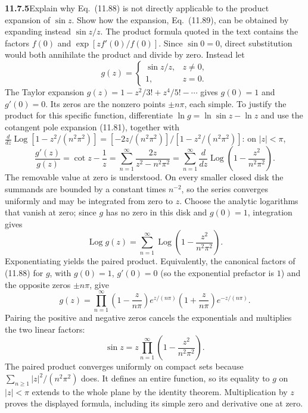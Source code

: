 \par\bigskip
\noindent\textbf{11.7.5}\quad Explain why Eq.~(11.88) is not directly
applicable to the product expansion of $\sin z$. Show how the expansion,
Eq.~(11.89), can be obtained by expanding instead $\sin z/z$.
\solution
The product formula quoted in the text contains the factors
$f(0)$ and $\exp[zf'(0)/f(0)]$. Since $\sin0=0$, direct substitution
would both annihilate the product and divide by zero. Instead let
\[
g(z)=\begin{cases}\sin z/z,&z\ne0,\\1,&z=0.\end{cases}
\]
The Taylor expansion $g(z)=1-z^2/3!+z^4/5!-\cdots$ gives
$g(0)=1$ and $g'(0)=0$. Its zeros are the nonzero points $\pm n\pi$,
each simple. To justify the product for this specific function,
differentiate $\ln g=\ln\sin z-\ln z$ and use the cotangent pole
expansion (11.81), together with
$\frac{d}{dz}\operatorname{Log}[1-z^2/(n^2\pi^2)]
=[-2z/(n^2\pi^2)]/[1-z^2/(n^2\pi^2)]$: on $|z|<\pi$,
\[
\frac{g'(z)}{g(z)}=\cot z-\frac1z
=\sum_{n=1}^{\infty}\frac{2z}{z^2-n^2\pi^2}
=\sum_{n=1}^{\infty}\frac{d}{dz}
\operatorname{Log}\!\left(1-\frac{z^2}{n^2\pi^2}\right).
\]
The removable value at zero is understood. On every smaller closed disk
the summands are bounded by a constant times $n^{-2}$, so the series
converges uniformly and may be integrated from zero to $z$.
Choose the analytic logarithms that vanish at zero; since $g$ has no zero
in this disk and $g(0)=1$, integration gives
\[
\operatorname{Log}g(z)=\sum_{n=1}^{\infty}
\operatorname{Log}\!\left(1-\frac{z^2}{n^2\pi^2}\right).
\]
Exponentiating yields the paired product. Equivalently, the canonical
factors of (11.88) for $g$, with $g(0)=1$, $g'(0)=0$ (so the
exponential prefactor is $1$) and the opposite zeros $\pm n\pi$, give
\[
g(z)=\prod_{n=1}^{\infty}
\left(1-\frac{z}{n\pi}\right)e^{z/(n\pi)}
\left(1+\frac{z}{n\pi}\right)e^{-z/(n\pi)}.
\]
Pairing the positive and negative zeros cancels the exponentials and
multiplies the two linear factors:
\[
\boxed{\sin z=z\prod_{n=1}^{\infty}
\left(1-\frac{z^2}{n^2\pi^2}\right)}.
\]
The paired product converges uniformly on compact sets because
$\sum_{n\ge1}|z|^2/(n^2\pi^2)$ does. It defines an entire function,
so its equality to $g$ on $|z|<\pi$ extends to the whole plane by the
identity theorem. Multiplication by $z$ proves the displayed formula,
including its simple zero and derivative one at zero.

